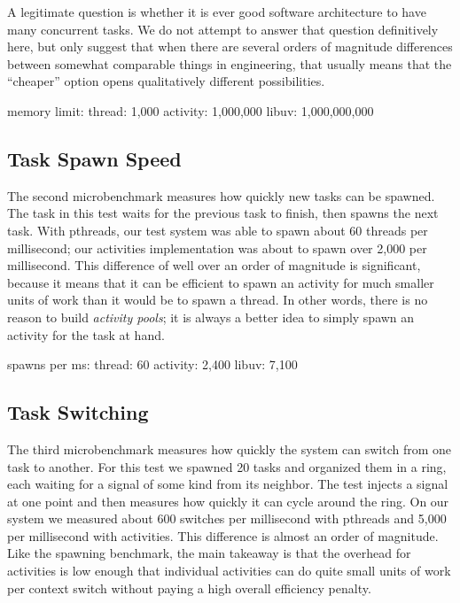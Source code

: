 \documentclass[10pt,preprint]{sigplanconf}
\begin{document}
A legitimate question is whether it is ever good software architecture to have many concurrent tasks.
We do not attempt to answer that question definitively here, but only suggest that when there are several orders of magnitude differences between somewhat comparable things in engineering, that usually means that the ``cheaper'' option opens qualitatively different possibilities.

memory limit: thread: 1,000 activity: 1,000,000 libuv: 1,000,000,000

\subsection{Task Spawn Speed}


The second microbenchmark measures how quickly new tasks can be spawned.
The task in this test waits for the previous task to finish, then spawns the next task.
With pthreads, our test system was able to spawn about 60 threads per millisecond; our activities implementation was about to spawn over 2,000 per millisecond.
This difference of well over an order of magnitude is significant, because it means that it can be efficient to spawn an activity for much smaller units of work than it would be to spawn a thread.
In other words, there is no reason to build \emph{activity pools}; it is always a better idea to simply spawn an activity for the task at hand.

spawns per ms: thread: 60 activity: 2,400 libuv: 7,100

\subsection{Task Switching}

The third microbenchmark measures how quickly the system can switch from one task to another.
For this test we spawned 20 tasks and organized them in a ring, each waiting for a signal of some kind from its neighbor.
The test injects a signal at one point and then measures how quickly it can cycle around the ring.
On our system we measured about 600 switches per millisecond with pthreads and 5,000 per millisecond with activities.
This difference is almost an order of magnitude.
Like the spawning benchmark, the main takeaway is that the overhead for activities is low enough that individual activities can do quite small units of work per context switch without paying a high overall efficiency penalty.
\end{document}
